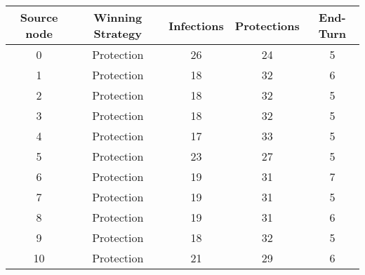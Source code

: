 \documentclass[results.tex]{subfiles}
\begin{document}
    \begin{center}
        \begin{tabular}{| c || c | c | c | c |}
            \hline
            {\bfseries Source node} & {\bfseries Winning Strategy} & {\bfseries Infections} & {\bfseries Protections}
            & {\bfseries End-Turn}
            \\  %
            \hline\hline
            0                       & Protection                   & 26                     & 24                      & 5                    \\
            \hline
            1                       & Protection                   & 18                     & 32                      & 6                    \\
            \hline
            2                       & Protection                   & 18                     & 32                      & 5                    \\
            \hline
            3                       & Protection                   & 18                     & 32                      & 5                    \\
            \hline
            4                       & Protection                   & 17                     & 33                      & 5                    \\
            \hline
            5                       & Protection                   & 23                     & 27                      & 5                    \\
            \hline
            6                       & Protection                   & 19                     & 31                      & 7                    \\
            \hline
            7                       & Protection                   & 19                     & 31                      & 5                    \\
            \hline
            8                       & Protection                   & 19                     & 31                      & 6                    \\
            \hline
            9                       & Protection                   & 18                     & 32                      & 5                    \\
            \hline
            10                      & Protection                   & 21                     & 29                      & 6                    \\

\end{tabular}
\end{center}
\end{document}
